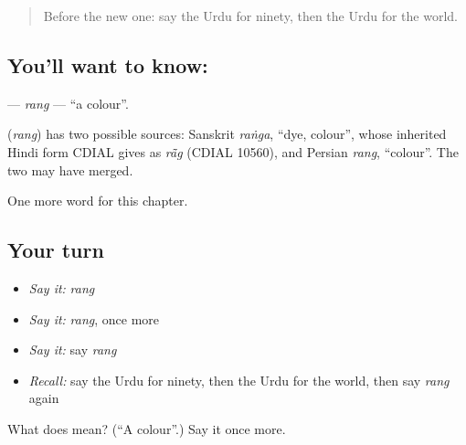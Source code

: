 \begin{quote}
Before the new one: say the Urdu for ninety, then the Urdu for the world.
\end{quote}

\subsection*{You'll want to know: }
\textbf{} — \emph{rang} — \textquotedblleft{}a colour\textquotedblright{}.

\begin{cousinweb}
\textbf{} (\emph{rang}) has two possible sources: Sanskrit \emph{raṅga}, \textquotedblleft{}dye, colour\textquotedblright{}, whose inherited Hindi form CDIAL gives as \emph{rā̃g} (CDIAL 10560), and Persian \emph{rang}, \textquotedblleft{}colour\textquotedblright{}. The two may have merged.
\end{cousinweb}

\begin{grammarlens}[title={What you've built}]
One more word for this chapter.
\end{grammarlens}

\subsection*{Your turn}
\begin{itemize}
\raggedright
  \item \emph{Say it:} \emph{rang}
  \item \emph{Say it:} \emph{rang}, once more
  \item \emph{Say it:} say \emph{rang}
  \item \emph{Recall:} say the Urdu for ninety, then the Urdu for the world, then say \emph{rang} again
\end{itemize}

\begin{tcolorbox}[breakable,colback=teal!4,colframe=teal!35!black,title={Before you move on}]
What does  mean? (\textquotedblleft{}A colour\textquotedblright{}.) Say it once more.
\end{tcolorbox}
